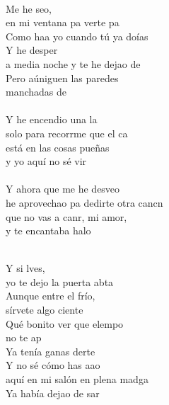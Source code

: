 \begin{cancion}[titulo=Desvelao, autor=Serko, cejilla=4]%
	    \\
	Me he seo, \\
	en mi ventana pa verte pa\\
	Como haa yo cuando tú ya doías \\
	Y he desper\\
	a media noche y te he dejao de \\
	Pero aúniguen las paredes \\
	manchadas de \\
\jump\\
	Y he encendio una la \\
	solo para recorrme que el ca\\
	está en las cosas pueñas \\
	y yo aquí no sé vir \\
\jump\\
	Y ahora que me he desveo \\
	he aprovechao pa dedirte otra cancn\\
	que no vas a canr, mi amor,\\
	y te encantaba halo\\\jump\\
	\begin{chorus}%
	Y si lves, \\
	yo te dejo la puerta abta\\
Aunque entre el frío, \\
	sírvete algo ciente\\
	Qué bonito ver que elempo \\
	no te ap \\
	Ya tenía ganas derte\\
	Y no sé cómo has aao \\
	aquí en mi salón en plena madga\\
	Ya había dejao de sar\\

\end{chorus}
\end{cancion}
